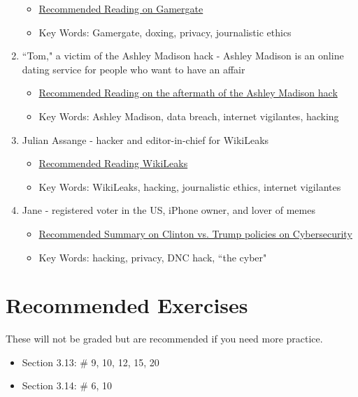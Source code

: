 \documentclass[12pt]{amsart}
\theoremstyle{plain}
\theoremstyle{definition}
\begin{document}
\begin{enumerate}[1.]
		\begin{itemize} 
			\item \href{https://en.wikipedia.org/wiki/Gamergate_controversy}{Recommended Reading on Gamergate}	
			\item Key Words: Gamergate, doxing, privacy, journalistic ethics
		\end{itemize}
	\item ``Tom," a victim of the Ashley Madison hack - Ashley Madison is an online dating service for people who want to have an affair
		\begin{itemize}
			\item \href{http://fusion.net/story/242502/ashley-madison-hack-aftermath/}{Recommended Reading on the aftermath of the Ashley Madison hack}	
			\item Key Words: Ashley Madison, data breach, internet vigilantes, hacking
		\end{itemize}
	\item Julian Assange - hacker and editor-in-chief for WikiLeaks
		\begin{itemize}
			\item \href{https://en.wikipedia.org/wiki/WikiLeaks}{Recommended Reading WikiLeaks}	
			\item Key Words: WikiLeaks, hacking, journalistic ethics, internet vigilantes
		\end{itemize}
	\item Jane - registered voter in the US, iPhone owner, and lover of memes
		\begin{itemize}
			\item \href{http://lifehacker.com/hillary-clinton-and-donald-trumps-cybersecurity-platfor-1784790979}{Recommended Summary on Clinton vs. Trump policies on Cybersecurity}	
			\item Key Words: hacking, privacy, DNC hack, ``the cyber"
		\end{itemize}
\end{enumerate}


\section{Recommended Exercises}
\noindent These will not be graded but are recommended if you need more practice.
\begin{itemize}
	\item Section 3.13: \# 9, 10, 12, 15, 20
	\item Section 3.14: \# 6, 10
\end{itemize}
	
\end{document}

